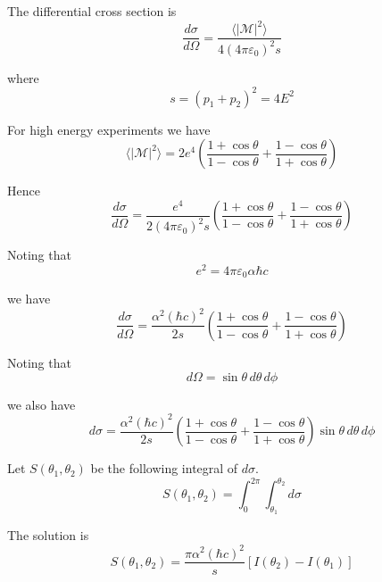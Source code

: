 The differential cross section is
\begin{equation*}
\frac{d\sigma}{d\Omega}=\frac{\langle|\mathcal{M}|^2\rangle}{4(4\pi\varepsilon_0)^2s}
\end{equation*}

where
\begin{equation*}
s=(p_1+p_2)^2=4E^2
\end{equation*}

For high energy experiments we have
\begin{equation*}
\langle|\mathcal{M}|^2\rangle=2e^4\left(
\frac{1+\cos\theta}{1-\cos\theta}+
\frac{1-\cos\theta}{1+\cos\theta}
\right)
\end{equation*}

Hence
\begin{equation*}
\frac{d\sigma}{d\Omega}
=\frac{e^4}{2(4\pi\varepsilon_0)^2s}\left(\frac{1+\cos\theta}{1-\cos\theta}+\frac{1-\cos\theta}{1+\cos\theta}\right)
\end{equation*}

Noting that
\begin{equation*}
e^2=4\pi\varepsilon_0\alpha\hbar c
\end{equation*}

we have
\begin{equation*}
\frac{d\sigma}{d\Omega}
=
\frac{\alpha^2(\hbar c)^2}{2s}
\left(
\frac{1+\cos\theta}{1-\cos\theta}+
\frac{1-\cos\theta}{1+\cos\theta}
\right)
\end{equation*}

Noting that
\begin{equation*}
d\Omega=\sin\theta\,d\theta\,d\phi
\end{equation*}

we also have
\begin{equation*}
d\sigma=
\frac{\alpha^2(\hbar c)^2}{2s}
\left(
\frac{1+\cos\theta}{1-\cos\theta}+
\frac{1-\cos\theta}{1+\cos\theta}
\right)\sin\theta\,d\theta\,d\phi
\end{equation*}

Let $S(\theta_1,\theta_2)$ be the following integral of $d\sigma$.
\begin{equation*}
S(\theta_1,\theta_2)=\int_0^{2\pi}\int_{\theta_1}^{\theta_2}d\sigma
\end{equation*}

The solution is
\begin{equation*}
S(\theta_1,\theta_2)=\frac{\pi\alpha^2(\hbar c)^2}{s}
[I(\theta_2)-I(\theta_1)]
\end{equation*}

